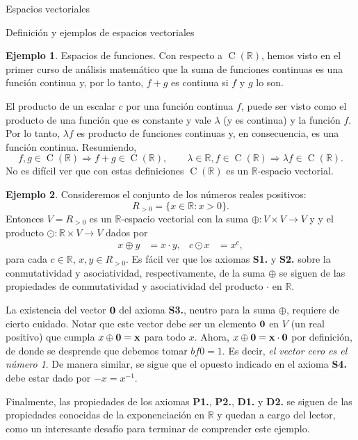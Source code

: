 \documentclass[a4paper,12pt,twoside,spanish,reqno]{amsbook}
\theoremstyle{definition}
\newtheorem{ejemplo}{Ejemplo}[section]
\theoremstyle{remark}
\newcommand{\R}{\mathbb R}
\begin{document}
\begin{chapter}{Espacios vectoriales}
\begin{section}{Definición y ejemplos de espacios vectoriales}
\begin{ejemplo}{\sc Espacios de funciones.}
				Con respecto a $\operatorname{C}(\R)$, hemos visto en el primer curso de análisis matemático  que la suma de funciones continuas es una función continua y, por lo tanto, $f+g$ es continua si $f$ y $g$ lo son.  
				
				El producto de un escalar $c$ por una función continua $f$,  puede ser visto como el producto de una función que es constante y vale $\lambda $ (y es continua) y la función $f$. Por lo tanto, $\lambda f$ es producto de funciones continuas y, en consecuencia, es una función continua.  Resumiendo,
				\begin{equation*}
				f, g \in \operatorname{C}(\R) \Rightarrow f+g \in \operatorname{C}(\R), \qquad \lambda \in \R, f \in \operatorname{C}(\R) \Rightarrow \lambda f \in \operatorname{C}(\R).
				\end{equation*}
				No es difícil ver que con estas definiciones $\operatorname{C}(\R)$  es un $\R$-espacio vectorial.
			\end{ejemplo}
			
            
			
			\medspace
			
			\begin{ejemplo}
            Consideremos el conjunto de los números reales positivos:
            \[
            R_{>0}=\{x\in\R : x>0\}.
            \]
            Entonces $V=R_{>0}$ es un $\R$-espacio vectorial con la suma $\oplus:V\times V\to V$ y  y el producto $\odot:\R\times V\to V$ dados por
            \begin{align*}
            x\oplus y&=x\cdot y, & c\odot x&=x^c,
            \end{align*}
            para cada $c\in\R$, $x,y\in R_{>0}$.
Es fácil ver que los axiomas \textbf{S1.} y \textbf{S2.} sobre la conmutatividad y asociatividad, respectivamente, de la suma $\oplus$ se siguen de las propiedades de conmutatividad y asociatividad del producto $\cdot$ en $\R$.

La existencia del vector $\bf0$ del axioma \textbf{S3.}, neutro para la suma $\oplus$, requiere de cierto cuidado. Notar que este vector debe ser un elemento $\bf0$ en $V$ (un real positivo) que cumpla $x\oplus \bf 0=x$ para todo $x$. Ahora, $x\oplus \bf0=x\cdot \bf0$ por definición, de donde se desprende que debemos tomar $bf0=1$. Es decir, {\it el vector cero es el número 1}. De manera similar, se sigue que el opuesto indicado en el  axioma \textbf{S4.} debe estar dado por $-x=x^{-1}$.

Finalmente, las propiedades de los axiomas \textbf{P1.}, \textbf{P2.}, \textbf{D1.} y \textbf{D2.} se siguen de las propiedades conocidas de la exponenciación en $\R$ y quedan a cargo del lector, como un interesante desafío para terminar de comprender este ejemplo.
\end{ejemplo}            
            

\end{section}
\end{chapter}
\end{document}
